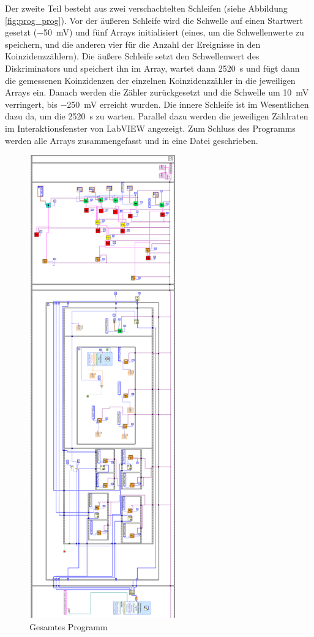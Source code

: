 Der zweite Teil besteht aus zwei verschachtelten Schleifen (siehe Abbildung \ref{fig:prog_prog}). Vor der äußeren Schleife wird die Schwelle auf einen Startwert gesetzt (\SI{-50}{\milli\volt}) und fünf Arrays initialisiert (eines, um die Schwellenwerte zu speichern, und die anderen vier für die Anzahl der Ereignisse in den Koinzidenzzählern). Die äußere Schleife setzt den Schwellenwert des Diskriminators und speichert ihn im Array, wartet dann \SI{2520}{\second} und fügt dann die gemessenen Koinzidenzen der einzelnen Koinzidenzzähler in die jeweiligen Arrays ein. Danach werden die Zähler zurückgesetzt und die Schwelle um \SI{10}{\milli\volt} verringert, bis \SI{-250}{\milli\volt} erreicht wurden.
Die innere Schleife ist im Wesentlichen dazu da, um die \SI{2520}{\second} zu warten. Parallel dazu werden die jeweiligen Zählraten im Interaktionsfenster von LabVIEW angezeigt.
Zum Schluss des Programms werden alle Arrays zusammengefasst und in eine Datei geschrieben.

\begin{figure}[h]
\centering
\includegraphics[height=20cm]{data/friedrich/prog_ges_rot.png}
\caption{Gesamtes Programm}
\label{fig:prog_all}
\end{figure}


